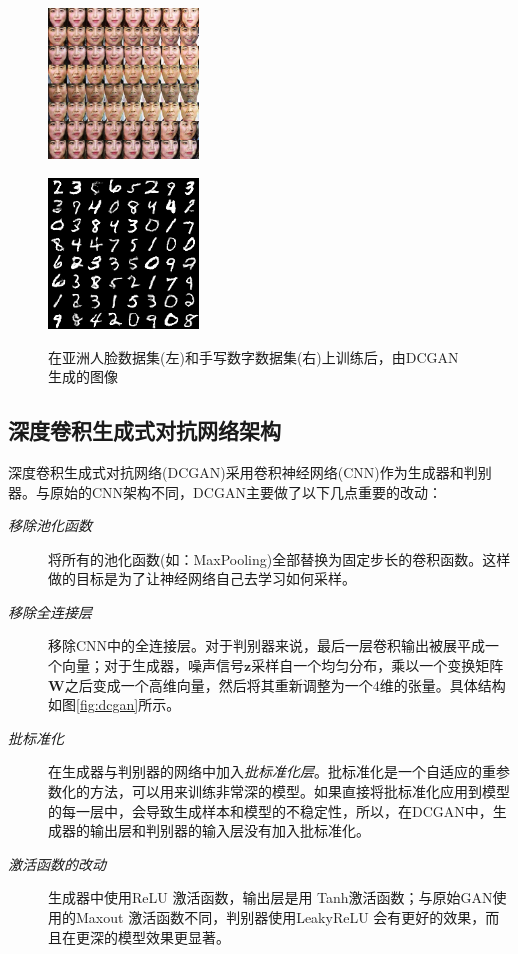 \documentclass[11pt]{ctexart}
\begin{document}
\begin{figure}[htbp]
\centering
\begin{minipage}[t]{0.48\textwidth}
\centering
\includegraphics[width=4cm]{asia_face}
\label{fig:face}
\end{minipage}
\begin{minipage}[t]{0.48\textwidth}
\centering
\includegraphics[width=4cm]{mnist}
\label{fig:mnist}
\end{minipage}
\caption{在亚洲人脸数据集(左)和手写数字数据集(右)上训练后，由DCGAN生成的图像}
\end{figure}

\subsection{深度卷积生成式对抗网络架构}
深度卷积生成式对抗网络(DCGAN)采用卷积神经网络(CNN)作为生成器和判别器。与原始的CNN架构不同，DCGAN主要做了以下几点重要的改动：
\begin{description}
	\item[\emph{移除池化函数}]将所有的池化函数(如：MaxPooling)全部替换为固定步长的卷积函数。这样做的目标是为了让神经网络自己去学习如何采样。
	\item[\emph{移除全连接层}] 移除CNN中的全连接层。对于判别器来说，最后一层卷积输出被展平成一个向量；对于生成器，噪声信号$\bm z$采样自一个均匀分布，乘以一个变换矩阵$\bm W$之后变成一个高维向量，然后将其重新调整为一个$4$维的张量。具体结构如图\ref{fig:dcgan}所示。
	\item[\emph{批标准化}] 在生成器与判别器的网络中加入\emph{批标准化层}\cite{ioffe2015batch}。批标准化是一个自适应的重参数化的方法，可以用来训练非常深的模型。如果直接将批标准化应用到模型的每一层中，会导致生成样本和模型的不稳定性，所以，在DCGAN中，生成器的输出层和判别器的输入层没有加入批标准化。
	\item[\emph{激活函数的改动}] 生成器中使用ReLU\cite{nair2010rectified} 激活函数，输出层是用 Tanh激活函数；与原始GAN使用的Maxout\cite{goodfellow2013maxout} 激活函数不同，判别器使用LeakyReLU\cite{xu2015empirical} 会有更好的效果，而且在更深的模型效果更显著。
\end{description}
\end{document}

